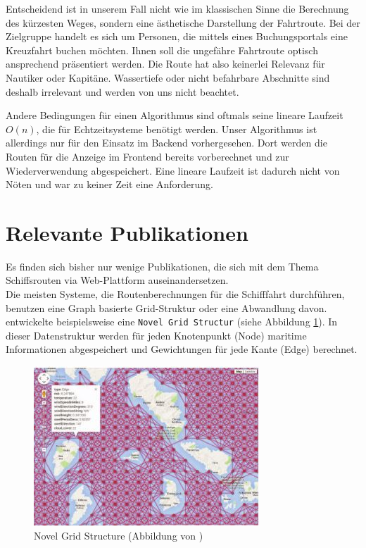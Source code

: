 \documentclass[letterpaper]{article}
\begin{document}
	Entscheidend ist in unserem Fall nicht wie im klassischen Sinne die Berechnung des kürzesten Weges, sondern eine ästhetische Darstellung der Fahrtroute. Bei der Zielgruppe handelt es sich um Personen, die mittels eines Buchungsportals eine Kreuzfahrt buchen möchten. Ihnen soll die ungefähre Fahrtroute optisch ansprechend präsentiert werden. Die Route hat also keinerlei Relevanz für Nautiker oder Kapitäne. Wassertiefe oder nicht befahrbare Abschnitte sind deshalb irrelevant und werden von uns nicht beachtet. 

	Andere Bedingungen für einen Algorithmus sind oftmals seine lineare Laufzeit $O(n)$, die für Echtzeitsysteme benötigt werden. Unser Algorithmus ist allerdings nur für den Einsatz im Backend vorhergesehen. Dort werden die Routen für die Anzeige im Frontend bereits vorberechnet und zur Wiederverwendung abgespeichert. Eine lineare Laufzeit ist dadurch nicht von Nöten und war zu keiner Zeit eine Anforderung.

\section{Relevante Publikationen}
	Es finden sich bisher nur wenige Publikationen, die sich mit dem Thema Schiffsrouten via Web-Plattform auseinandersetzen.\\

	Die meisten Systeme, die Routenberechnungen für die Schifffahrt durchführen, benutzen eine Graph basierte Grid-Struktur oder eine Abwandlung davon. \cite{makrygiorgos15} entwickelte beispielsweise eine \texttt{Novel Grid Structur} (siehe Abbildung \ref{fig:novel grid structure}). In dieser Datenstruktur werden für jeden Knotenpunkt (Node) maritime Informationen abgespeichert und Gewichtungen für jede Kante (Edge) berechnet.

	\begin{figure}[!htbp]
		\centering
		\includegraphics[width=.8\linewidth]{novel_grid_structure}
		\caption{Novel Grid Structure (Abbildung von \cite{makrygiorgos15})}
		\label{fig:novel grid structure}
	\end{figure}
\end{document}
